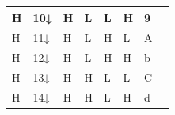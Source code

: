 \documentclass[a4paper, 11pt, uplatex]{jsarticle}
\begin{document}
\begin{table}[H]
\begin{center}
\begin{tabular}{|l|l|l|l|l|l|l|l|}
H                                                                 & 10↓                                                               & H                                                               & L                                                               & L                                                               & H                                                               & 9                                                                       &                     \\ \hline
H                                                                 & 11↓                                                               & H                                                               & L                                                               & H                                                               & L                                                               & A                                                                       &                     \\ \hline
H                                                                 & 12↓                                                               & H                                                               & L                                                               & H                                                               & H                                                               & b                                                                       &                     \\ \hline
H                                                                 & 13↓                                                               & H                                                               & H                                                               & L                                                               & L                                                               & C                                                                       &                     \\ \hline
H                                                                 & 14↓                                                               & H                                                               & H                                                               & L                                                               & H                                                               & d                                                                       &                     \\ \hline

\end{tabular}
\end{center}
\end{table}
\end{document}
